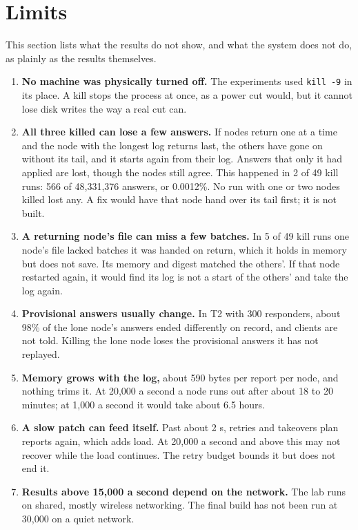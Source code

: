 \section{Limits}
\label{sec:limits}

This section lists what the results do not show, and what the system does not do, as plainly as the results themselves.

\begin{enumerate}
  \item \textbf{No machine was physically turned off.} The experiments used \texttt{kill -9} in its place. A kill stops the process at once, as a power cut would, but it cannot lose disk writes the way a real cut can.
  \item \textbf{All three killed can lose a few answers.} If nodes return one at a time and the node with the longest log returns last, the others have gone on without its tail, and it starts again from their log. Answers that only it had applied are lost, though the nodes still agree. This happened in 2 of 49 kill runs: 566 of 48,331,376 answers, or 0.0012\%. No run with one or two nodes killed lost any. A fix would have that node hand over its tail first; it is not built.
  \item \textbf{A returning node's file can miss a few batches.} In 5 of 49 kill runs one node's file lacked batches it was handed on return, which it holds in memory but does not save. Its memory and digest matched the others'. If that node restarted again, it would find its log is not a start of the others' and take the log again.
  \item \textbf{Provisional answers usually change.} In T2 with 300 responders, about 98\% of the lone node's answers ended differently on record, and clients are not told. Killing the lone node loses the provisional answers it has not replayed.
  \item \textbf{Memory grows with the log,} about 590 bytes per report per node, and nothing trims it. At 20,000 a second a node runs out after about 18 to 20 minutes; at 1,000 a second it would take about 6.5 hours.
  \item \textbf{A slow patch can feed itself.} Past about 2 s, retries and takeovers plan reports again, which adds load. At 20,000 a second and above this may not recover while the load continues. The retry budget bounds it but does not end it.
  \item \textbf{Results above 15,000 a second depend on the network.} The lab runs on shared, mostly wireless networking. The final build has not been run at 30,000 on a quiet network.

\end{enumerate}

